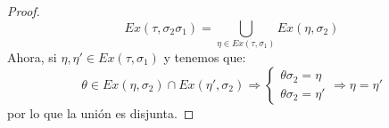 \begin{lema}
\begin{proof}
\begin{equation*}
            Ex(\tau,\sigma_2\sigma_1) = \bigcup_{\eta \in Ex(\tau,\sigma_1)} Ex(\eta,\sigma_2)
        \end{equation*}
        Ahora, si $\eta,\eta'\in Ex(\tau,\sigma_1)$ y tenemos que:
        \begin{equation*}
            \theta \in  Ex(\eta,\sigma_2)\cap Ex(\eta',\sigma_2) \Longrightarrow \left\{\begin{array}{l}
                \theta\sigma_2 = \eta \\
                \theta \sigma_2 = \eta'
            \end{array}\right. \Longrightarrow \eta = \eta'
        \end{equation*}
        por lo que la unión es disjunta.
    \end{proof}
\end{lema}

